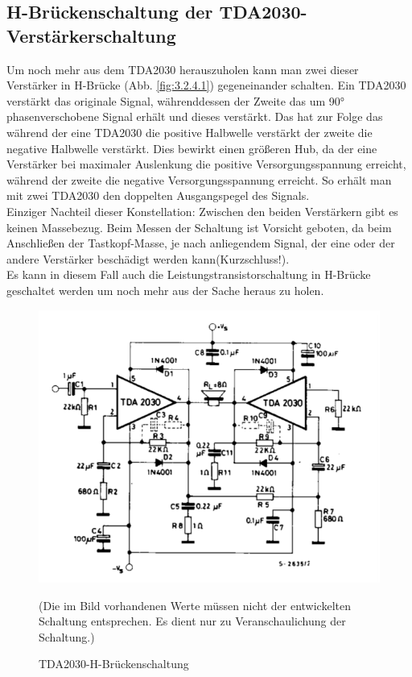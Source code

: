 \subsection{H-Brückenschaltung der TDA2030-Verstärkerschaltung}\label{subsec:8.3.4}
Um noch mehr aus dem TDA2030 herauszuholen kann man zwei dieser Verstärker in H-Brücke (Abb. \ref{fig:3.2.4.1}) gegeneinander schalten.
Ein TDA2030 verstärkt das originale Signal, währenddessen der Zweite das um 90° phasenverschobene Signal erhält und dieses verstärkt.
Das hat zur Folge das während der eine TDA2030 die positive Halbwelle verstärkt der zweite die negative Halbwelle verstärkt.
Dies bewirkt einen größeren Hub, da der eine Verstärker bei maximaler Auslenkung die positive Versorgungsspannung erreicht, während der zweite die negative Versorgungsspannung erreicht.
So erhält man mit zwei TDA2030 den doppelten Ausgangspegel des Signals.\\
Einziger Nachteil dieser Konstellation: Zwischen den beiden Verstärkern gibt es keinen Massebezug.
Beim Messen der Schaltung ist Vorsicht geboten, da beim Anschließen der Tastkopf-Masse, je nach anliegendem Signal, der eine oder der andere Verstärker beschädigt werden kann(Kurzschluss!).\\
Es kann in diesem Fall auch die Leistungstransistorschaltung in H-Brücke geschaltet werden um noch mehr aus der Sache heraus zu holen.
\begin{figure} [H]
	\centering
	\includegraphics[width=1\textwidth]{img/Grundlagen/TDA2030/TDA2030-H-Bruecke.PNG}
	\caption[TDA2030-H-Brückenschaltung]{TDA2030-H-Brückenschaltung\footnotemark}
	\text (Die im Bild vorhandenen Werte müssen nicht der entwickelten Schaltung entsprechen. Es dient nur zu Veranschaulichung der Schaltung.)
	\label {fig:8.3.4.1}
\end{figure}

